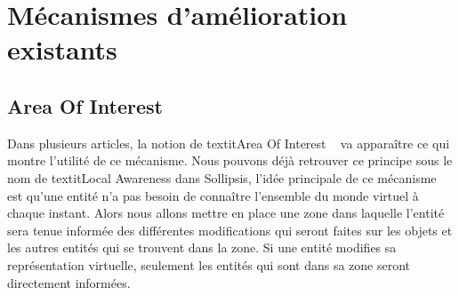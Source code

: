 \section{Mécanismes d'amélioration existants}
	\subsection{Area Of Interest}
	Dans plusieurs articles, la notion de textit{Area Of Interest} ~\cite{1403002,1267692,1015507} va apparaître ce qui montre l'utilité de ce mécanisme. Nous pouvons déjà retrouver ce principe sous le nom de textit{Local Awareness} dans Sollipsis, l'idée principale de ce mécanisme est qu'une entité n'a pas besoin de connaître l'ensemble du monde virtuel à chaque instant. Alors nous allons mettre en place une zone dans laquelle l'entité sera tenue informée des différentes modifications qui seront faites sur les objets et les autres entités qui se trouvent dans la zone. Si une entité modifies sa représentation virtuelle, seulement les entités qui sont dans sa zone seront directement informées.\\

